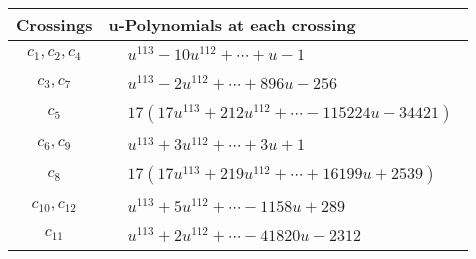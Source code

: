 \documentclass[1p]{elsarticle_modified}
\theoremstyle{definition}
\begin{document}
\begin{tabular}{m{50pt}|m{274pt}}
Crossings & \hspace{64pt}u-Polynomials at each crossing \\
\hline $$\begin{aligned}c_{1},c_{2},c_{4}\end{aligned}$$&$\begin{aligned}
&u^{113}-10 u^{112}+\cdots+u-1
\end{aligned}$\\
\hline $$\begin{aligned}c_{3},c_{7}\end{aligned}$$&$\begin{aligned}
&u^{113}-2 u^{112}+\cdots+896 u-256
\end{aligned}$\\
\hline $$\begin{aligned}c_{5}\end{aligned}$$&$\begin{aligned}
&17(17 u^{113}+212 u^{112}+\cdots-115224 u-34421)
\end{aligned}$\\
\hline $$\begin{aligned}c_{6},c_{9}\end{aligned}$$&$\begin{aligned}
&u^{113}+3 u^{112}+\cdots+3 u+1
\end{aligned}$\\
\hline $$\begin{aligned}c_{8}\end{aligned}$$&$\begin{aligned}
&17(17 u^{113}+219 u^{112}+\cdots+16199 u+2539)
\end{aligned}$\\
\hline $$\begin{aligned}c_{10},c_{12}\end{aligned}$$&$\begin{aligned}
&u^{113}+5 u^{112}+\cdots-1158 u+289
\end{aligned}$\\
\hline $$\begin{aligned}c_{11}\end{aligned}$$&$\begin{aligned}
&u^{113}+2 u^{112}+\cdots-41820 u-2312
\end{aligned}$\\
\hline
\end{tabular}\\~\\
\end{document}
